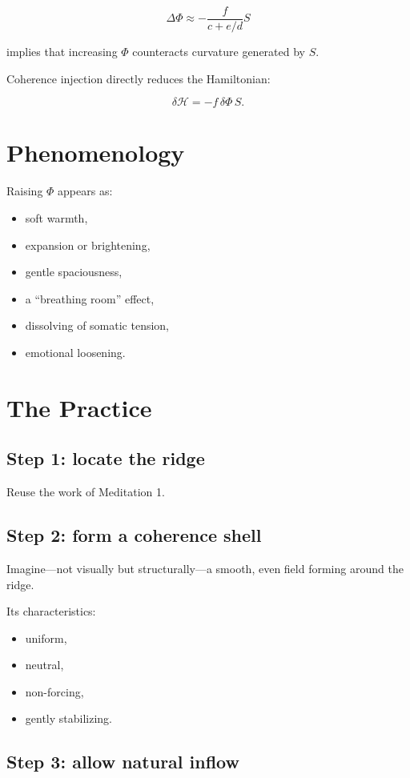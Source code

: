 \documentclass[12pt]{article}
\begin{document}
\[
\Delta\Phi \approx -\frac{f}{c + e/d} S
\]

implies that increasing $\Phi$ counteracts curvature generated by $S$.

Coherence injection directly reduces the Hamiltonian:

\[
\delta\mathcal{H} = - f\,\delta\Phi\, S.
\]

\section{Phenomenology}

Raising $\Phi$ appears as:

\begin{itemize}
    \item soft warmth,
    \item expansion or brightening,
    \item gentle spaciousness,
    \item a ``breathing room'' effect,
    \item dissolving of somatic tension,
    \item emotional loosening.
\end{itemize}

\section{The Practice}

\subsection*{Step 1: locate the ridge}
Reuse the work of Meditation 1.

\subsection*{Step 2: form a coherence shell}

Imagine—not visually but structurally—a smooth, even field forming around the ridge.

Its characteristics:

\begin{itemize}
    \item uniform,
    \item neutral,
    \item non-forcing,
    \item gently stabilizing.
\end{itemize}

\subsection*{Step 3: allow natural inflow}
\end{document}
